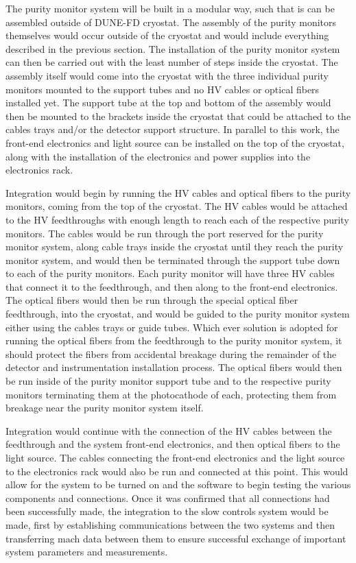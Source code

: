 The purity monitor system will be built in a modular way, such that is can be assembled outside of DUNE-FD cryostat.  The assembly of the purity monitors themselves would occur outside of the cryostat and would include everything described in the previous section.  The installation of the purity monitor system can then be carried out with the least number of steps inside the cryostat.  The assembly itself would come into the cryostat with the three individual purity monitors mounted to the support tubes and no HV cables or optical fibers installed yet.  The support tube at the top and bottom of the assembly would then be mounted to the brackets inside the cryostat that could be attached to the cables trays and/or the detector support structure.  In parallel to this work, the front-end electronics and light source can be installed on the top of the cryostat, along with the installation of the electronics and power supplies into the electronics rack.  

Integration would begin by running the HV cables and optical fibers to the purity monitors, coming from the top of the cryostat.  The HV cables would be attached to the HV feedthroughs with enough length to reach each of the respective purity monitors.  The cables would be run through the port reserved for the purity monitor system, along cable trays inside the cryostat until they reach the purity monitor system, and would then be terminated through the support tube down to each of the purity monitors.  Each purity monitor will have three HV cables that connect it to the feedthrough, and then along to the front-end electronics.  The optical fibers would then be run through the special optical fiber feedthrough, into the cryostat, and would be guided to the purity monitor system either using the cables trays or guide tubes.  Which ever solution is adopted for running the optical fibers from the feedthrough to the purity monitor system, it should protect the fibers from accidental breakage during the remainder of the detector and instrumentation installation process.  The optical fibers would then be run inside of the purity monitor support tube and to the respective purity monitors terminating them at the photocathode of each, protecting them from breakage near the purity monitor system itself.

Integration would continue with the connection of the HV cables between the feedthrough and the system front-end electronics, and then optical fibers to the light source.  The cables connecting the front-end electronics and the light source to the electronics rack would also be run and connected at this point.  This would allow for the system to be turned on and the software to begin testing the various components and connections.  Once it was confirmed that all connections had been successfully made, the integration to the slow controls system would be made, first by establishing communications between the two systems and then transferring mach data between them to ensure successful exchange of important system parameters and measurements.  


